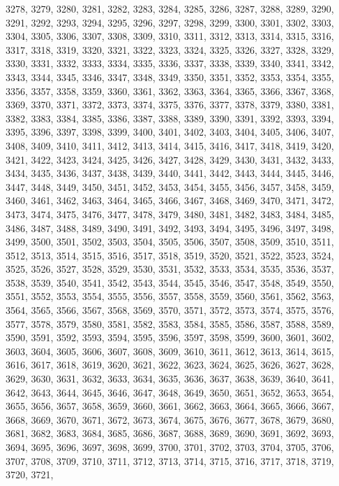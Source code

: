 \documentclass[a4paper,11pt]{article}
\numberwithin{equation}{section}
\begin{document}
3278, 3279, 3280, 3281, 3282, 3283, 3284, 3285, 3286, 3287, 3288, 3289,
3290, 3291, 3292, 3293, 3294, 3295, 3296, 3297, 3298, 3299, 3300, 3301,
3302, 3303, 3304, 3305, 3306, 3307, 3308, 3309, 3310, 3311, 3312, 3313,
3314, 3315, 3316, 3317, 3318, 3319, 3320, 3321, 3322, 3323, 3324, 3325,
3326, 3327, 3328, 3329, 3330, 3331, 3332, 3333, 3334, 3335, 3336, 3337,
3338, 3339, 3340, 3341, 3342, 3343, 3344, 3345, 3346, 3347, 3348, 3349,
3350, 3351, 3352, 3353, 3354, 3355, 3356, 3357, 3358, 3359, 3360, 3361,
3362, 3363, 3364, 3365, 3366, 3367, 3368, 3369, 3370, 3371, 3372, 3373,
3374, 3375, 3376, 3377, 3378, 3379, 3380, 3381, 3382, 3383, 3384, 3385,
3386, 3387, 3388, 3389, 3390, 3391, 3392, 3393, 3394, 3395, 3396, 3397,
3398, 3399, 3400, 3401, 3402, 3403, 3404, 3405, 3406, 3407, 3408, 3409,
3410, 3411, 3412, 3413, 3414, 3415, 3416, 3417, 3418, 3419, 3420, 3421,
3422, 3423, 3424, 3425, 3426, 3427, 3428, 3429, 3430, 3431, 3432, 3433,
3434, 3435, 3436, 3437, 3438, 3439, 3440, 3441, 3442, 3443, 3444, 3445,
3446, 3447, 3448, 3449, 3450, 3451, 3452, 3453, 3454, 3455, 3456, 3457,
3458, 3459, 3460, 3461, 3462, 3463, 3464, 3465, 3466, 3467, 3468, 3469,
3470, 3471, 3472, 3473, 3474, 3475, 3476, 3477, 3478, 3479, 3480, 3481,
3482, 3483, 3484, 3485, 3486, 3487, 3488, 3489, 3490, 3491, 3492, 3493,
3494, 3495, 3496, 3497, 3498, 3499, 3500, 3501, 3502, 3503, 3504, 3505,
3506, 3507, 3508, 3509, 3510, 3511, 3512, 3513, 3514, 3515, 3516, 3517,
3518, 3519, 3520, 3521, 3522, 3523, 3524, 3525, 3526, 3527, 3528, 3529,
3530, 3531, 3532, 3533, 3534, 3535, 3536, 3537, 3538, 3539, 3540, 3541,
3542, 3543, 3544, 3545, 3546, 3547, 3548, 3549, 3550, 3551, 3552, 3553,
3554, 3555, 3556, 3557, 3558, 3559, 3560, 3561, 3562, 3563, 3564, 3565,
3566, 3567, 3568, 3569, 3570, 3571, 3572, 3573, 3574, 3575, 3576, 3577,
3578, 3579, 3580, 3581, 3582, 3583, 3584, 3585, 3586, 3587, 3588, 3589,
3590, 3591, 3592, 3593, 3594, 3595, 3596, 3597, 3598, 3599, 3600, 3601,
3602, 3603, 3604, 3605, 3606, 3607, 3608, 3609, 3610, 3611, 3612, 3613,
3614, 3615, 3616, 3617, 3618, 3619, 3620, 3621, 3622, 3623, 3624, 3625,
3626, 3627, 3628, 3629, 3630, 3631, 3632, 3633, 3634, 3635, 3636, 3637,
3638, 3639, 3640, 3641, 3642, 3643, 3644, 3645, 3646, 3647, 3648, 3649,
3650, 3651, 3652, 3653, 3654, 3655, 3656, 3657, 3658, 3659, 3660, 3661,
3662, 3663, 3664, 3665, 3666, 3667, 3668, 3669, 3670, 3671, 3672, 3673,
3674, 3675, 3676, 3677, 3678, 3679, 3680, 3681, 3682, 3683, 3684, 3685,
3686, 3687, 3688, 3689, 3690, 3691, 3692, 3693, 3694, 3695, 3696, 3697,
3698, 3699, 3700, 3701, 3702, 3703, 3704, 3705, 3706, 3707, 3708, 3709,
3710, 3711, 3712, 3713, 3714, 3715, 3716, 3717, 3718, 3719, 3720, 3721,
\end{document}
